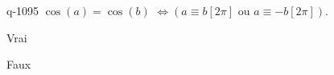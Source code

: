 \begin{truefalse}{q-1095}
$\cos(a)=\cos(b)$  $\Leftrightarrow \left(a\equiv b [2\pi]\text{ ou } a\equiv -b [2\pi]\right)$.
\item* Vrai
\item Faux
\end{truefalse}

